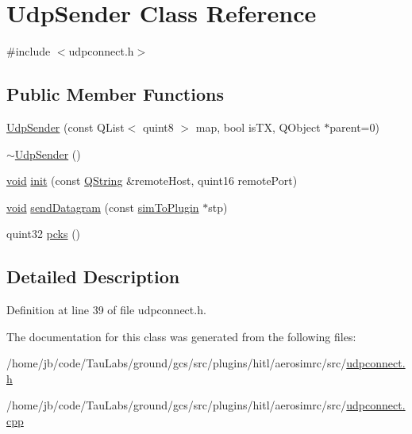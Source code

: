 \hypertarget{class_udp_sender}{\section{\-Udp\-Sender \-Class \-Reference}
\label{class_udp_sender}
}


{\ttfamily \#include $<$udpconnect.\-h$>$}

\subsection*{\-Public \-Member \-Functions}
\begin{DoxyCompactItemize}
\item 
\hyperlink{group___aero_sim_r_c_ga33d974a790381e7266d6d4c57ca40f1f}{\-Udp\-Sender} (const \-Q\-List$<$ quint8 $>$ map, bool is\-T\-X, \-Q\-Object $\ast$parent=0)
\item 
\hyperlink{group___aero_sim_r_c_gaa3cfe219b7bfa771b77b85dacc5d5e50}{$\sim$\-Udp\-Sender} ()
\item 
\hyperlink{group___u_a_v_objects_plugin_ga444cf2ff3f0ecbe028adce838d373f5c}{void} \hyperlink{group___aero_sim_r_c_ga14593f9c2d83a4feb7c05639f521cd58}{init} (const \hyperlink{group___u_a_v_objects_plugin_gab9d252f49c333c94a72f97ce3105a32d}{\-Q\-String} \&remote\-Host, quint16 remote\-Port)
\item 
\hyperlink{group___u_a_v_objects_plugin_ga444cf2ff3f0ecbe028adce838d373f5c}{void} \hyperlink{group___aero_sim_r_c_ga1c5e2d6839935b0860fc2bb6912ec125}{send\-Datagram} (const \hyperlink{structsim_to_plugin}{sim\-To\-Plugin} $\ast$stp)
\item 
quint32 \hyperlink{group___aero_sim_r_c_gaa06c6b62e9498dee34b35c225479a52a}{pcks} ()
\end{DoxyCompactItemize}


\subsection{\-Detailed \-Description}


\-Definition at line 39 of file udpconnect.\-h.



\-The documentation for this class was generated from the following files\-:\begin{DoxyCompactItemize}
\item 
/home/jb/code/\-Tau\-Labs/ground/gcs/src/plugins/hitl/aerosimrc/src/\hyperlink{udpconnect_8h}{udpconnect.\-h}\item 
/home/jb/code/\-Tau\-Labs/ground/gcs/src/plugins/hitl/aerosimrc/src/\hyperlink{udpconnect_8cpp}{udpconnect.\-cpp}\end{DoxyCompactItemize}
